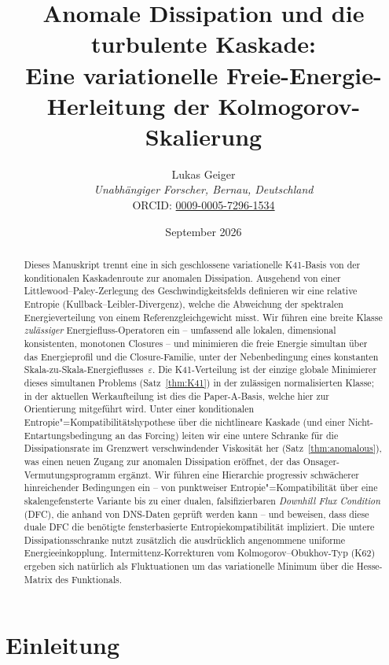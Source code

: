 \documentclass[12pt,a4paper]{article}
\title{Anomale Dissipation und die turbulente Kaskade:\\
Eine variationelle Freie-Energie-Herleitung der Kolmogorov-Skalierung}
\author{Lukas Geiger\\
\textit{Unabhängiger Forscher, Bernau, Deutschland}\\
ORCID: \href{https://orcid.org/0009-0005-7296-1534}{0009-0005-7296-1534}}
\date{September 2026}
\theoremstyle{breakdef}
\theoremstyle{breakplain}
\theoremstyle{breakdef}
\begin{document}
\maketitle

\begin{abstract}
Dieses Manuskript trennt eine in sich geschlossene variationelle K41-Basis
von der konditionalen Kaskadenroute zur anomalen Dissipation. Ausgehend
von einer Littlewood--Paley-Zerlegung des Geschwindigkeitsfelds definieren
wir eine relative Entropie (Kullback--Leibler-Divergenz), welche die Abweichung der
spektralen Energieverteilung von einem Referenzgleichgewicht misst. Wir
führen eine breite Klasse \emph{zulässiger} Energiefluss-Operatoren ein
-- umfassend alle lokalen, dimensional konsistenten, monotonen Closures --
und minimieren die freie Energie simultan über das Energieprofil und die
Closure-Familie, unter der Nebenbedingung eines konstanten
Skala-zu-Skala-Energieflusses~$\varepsilon$. Die K41-Verteilung ist der
einzige globale Minimierer dieses simultanen Problems
(Satz~\ref{thm:K41}) in der zulässigen normalisierten Klasse; in der aktuellen
Werkaufteilung ist dies die Paper-A-Basis, welche hier zur Orientierung
mitgeführt wird. Unter einer konditionalen
Entropie"=Kompatibilitätshypothese über die nichtlineare Kaskade (und
einer Nicht-Entartungsbedingung an das Forcing) leiten wir eine untere
Schranke für die Dissipationsrate im Grenzwert verschwindender Viskosität
her (Satz~\ref{thm:anomalous}), was einen neuen Zugang zur anomalen
Dissipation eröffnet, der das Onsager-Vermutungsprogramm ergänzt.
Wir führen eine Hierarchie progressiv schwächerer hinreichender
Bedingungen ein -- von punktweiser Entropie"=Kompatibilität über eine
skalengefensterte Variante bis zu einer dualen, falsifizierbaren
\emph{Downhill Flux Condition} (DFC), die anhand von DNS-Daten geprüft
werden kann -- und beweisen, dass diese duale DFC die benötigte
fensterbasierte Entropiekompatibilität impliziert. Die untere
Dissipationsschranke nutzt zusätzlich die ausdrücklich angenommene uniforme
Energieeinkopplung.
Intermittenz-Korrekturen vom Kolmogorov--Obukhov-Typ (K62) ergeben sich
natürlich als Fluktuationen um das variationelle Minimum über die
Hesse-Matrix des Funktionals.
\end{abstract}
\clearpage
\tableofcontents
\clearpage


\section{Einleitung}\label{sec:intro}
\end{document}
